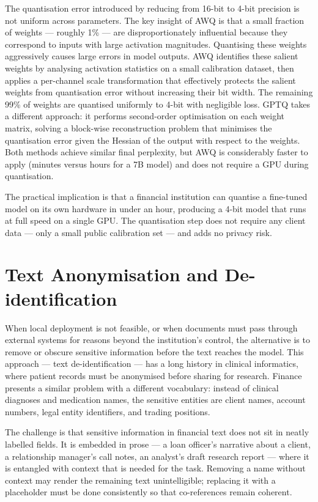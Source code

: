 \begin{deepdive}
The quantisation error introduced by reducing from 16-bit to 4-bit precision is not uniform across parameters. The key insight of AWQ is that a small fraction of weights — roughly 1\% — are disproportionately influential because they correspond to inputs with large activation magnitudes. Quantising these weights aggressively causes large errors in model outputs. AWQ identifies these salient weights by analysing activation statistics on a small calibration dataset, then applies a per-channel scale transformation that effectively protects the salient weights from quantisation error without increasing their bit width. The remaining 99\% of weights are quantised uniformly to 4-bit with negligible loss. GPTQ takes a different approach: it performs second-order optimisation on each weight matrix, solving a block-wise reconstruction problem that minimises the quantisation error given the Hessian of the output with respect to the weights. Both methods achieve similar final perplexity, but AWQ is considerably faster to apply (minutes versus hours for a 7B model) and does not require a GPU during quantisation.

The practical implication is that a financial institution can quantise a fine-tuned model on its own hardware in under an hour, producing a 4-bit model that runs at full speed on a single GPU. The quantisation step does not require any client data — only a small public calibration set — and adds no privacy risk.
\end{deepdive}

\section{Text Anonymisation and De-identification}
\label{sec:ch15-anonymisation}

\begin{context}
When local deployment is not feasible, or when documents must pass through external systems for reasons beyond the institution's control, the alternative is to remove or obscure sensitive information before the text reaches the model. This approach — text de-identification — has a long history in clinical informatics, where patient records must be anonymised before sharing for research. Finance presents a similar problem with a different vocabulary: instead of clinical diagnoses and medication names, the sensitive entities are client names, account numbers, legal entity identifiers, and trading positions.

The challenge is that sensitive information in financial text does not sit in neatly labelled fields. It is embedded in prose — a loan officer's narrative about a client, a relationship manager's call notes, an analyst's draft research report — where it is entangled with context that is needed for the task. Removing a name without context may render the remaining text unintelligible; replacing it with a placeholder must be done consistently so that co-references remain coherent.
\end{context}

